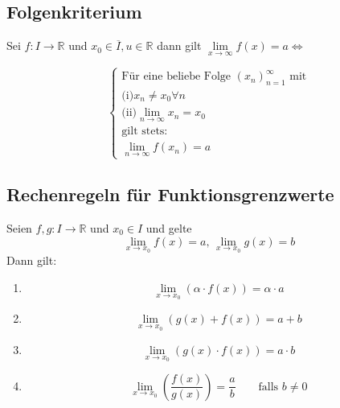 \documentclass[10pt]{article}
\newcommand{\R}{\mathbb{R}}
\begin{document}
    \subsection{Folgenkriterium}
    Sei $f: I \rightarrow \R$ und $x_0 \in \overline{I}, u \in \R$ dann gilt
    $\lim\limits_{x \rightarrow \infty} f(x) = a \Leftrightarrow$

    \begin{equation*}
        \begin{cases}
            \text{Für eine beliebe Folge } {(x_n)}_{n=1}^\infty \text{ mit}\\
            \text{(i)} x_n \neq x_0 \forall n\\
            \text{(ii)} \lim\limits_{n \rightarrow \infty} x_n = x_0\\
            \text{gilt stets:}\\
            \lim\limits_{n \rightarrow \infty} f(x_n) = a
        \end{cases}
    \end{equation*}

    \subsection{Rechenregeln für Funktionsgrenzwerte}
    Seien $f, g: I \rightarrow \R$ und $x_0 \in I$ und gelte
    \begin{equation*}
        \lim_{x \rightarrow x_0} f(x) = a \text{, }
        \lim_{x \rightarrow x_0} g(x) = b
    \end{equation*}
    Dann gilt:
    \begin{enumerate}[label= (\alph*)]
        \item
            \begin{equation*}
                \lim_{x \rightarrow x_0} (\alpha \cdot f(x)) = \alpha \cdot a
            \end{equation*}
        \item
            \begin{equation*}
                \lim_{x \rightarrow x_0} (g(x) + f(x)) = a + b
            \end{equation*}
        \item
            \begin{equation*}
                \lim_{x \rightarrow x_0} (g(x) \cdot f(x)) = a \cdot b
            \end{equation*}
        \item
            \begin{equation*}
                \lim_{x \rightarrow x_0} \left(\frac{f(x)}{g(x)}\right) = \frac{a}{b}
                \qquad\text{falls } b \neq 0
            \end{equation*}
    \end{enumerate}
\end{document}
